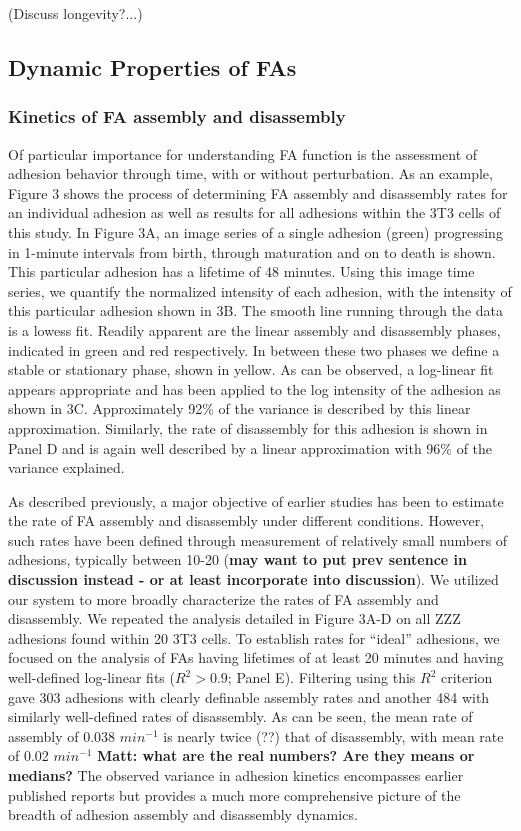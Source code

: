 \documentclass[10pt]{article}
\begin{document}
(Discuss longevity?...)

\subsection*{Dynamic Properties of FAs}
\subsubsection*{Kinetics of FA assembly and disassembly}
Of particular importance for understanding FA function is the assessment of adhesion
behavior through time, with or without perturbation. As an example, Figure 3
shows the process of determining FA assembly and disassembly rates for an
individual adhesion as well as results for all adhesions within the 3T3 cells of
this study. In Figure 3A, an image series of a single adhesion (green) progressing
in 1-minute intervals from birth, through maturation and on to death is shown.
This particular adhesion has a lifetime of 48 minutes. Using this image time
series, we quantify the normalized intensity of each adhesion, with the
intensity of this particular adhesion shown in 3B. The smooth line running
through the data is a lowess fit. Readily apparent are the linear assembly and
disassembly phases, indicated in green and red respectively. In between these
two phases we define a stable or stationary phase, shown in yellow. As can be
observed, a log-linear fit appears appropriate and has been applied to the log
intensity of the adhesion as shown in 3C. Approximately 92\% of the
variance is described by this linear approximation. Similarly, the rate of
disassembly for this adhesion is shown in Panel D and is again well described by
a linear approximation with 96\% of the variance explained.

As described previously, a major objective of earlier studies has been to
estimate the rate of FA assembly and disassembly under different conditions.
However, such rates have been defined through measurement of relatively small
numbers of adhesions, typically between 10-20 (\textbf{may want to put prev sentence in
discussion instead - or at least incorporate into discussion}). We utilized our
system to more broadly characterize the rates of FA assembly and disassembly. We
repeated the analysis detailed in Figure 3A-D on all ZZZ adhesions found within
20 3T3 cells. To establish rates for ``ideal'' adhesions, we focused on the
analysis of FAs having lifetimes of at least 20 minutes and having well-defined
log-linear fits ($R^2 > 0.9$; Panel E). Filtering using this $R^2$ criterion
gave 303 adhesions with clearly definable assembly rates and another 484 with
similarly well-defined rates of disassembly. As can be seen, the mean rate of
assembly of 0.038 $min^{-1}$ is nearly twice (??) that of disassembly, with mean
rate of 0.02 $min^{-1}$ \textbf{Matt: what are the real numbers? Are they means
or medians?} The observed variance in adhesion kinetics encompasses earlier published reports but provides a much more comprehensive picture of the breadth of adhesion assembly and disassembly dynamics.
\end{document}
